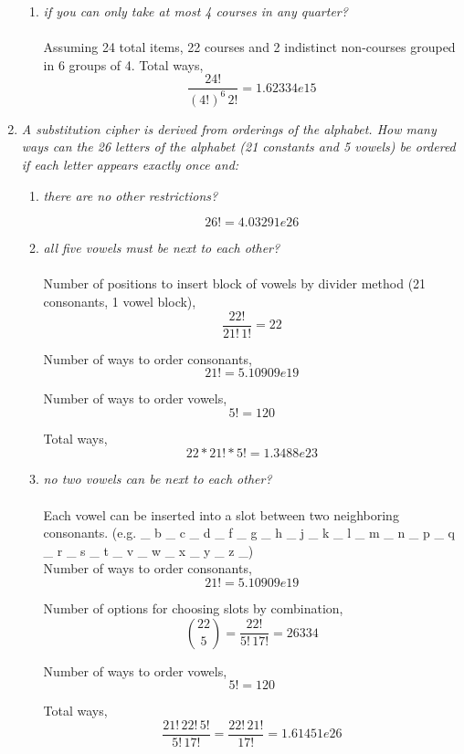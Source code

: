 \documentclass{article} %
\begin{document}
\begin{enumerate}
\begin{enumerate}
		\item \textit{if you can only take at most 4 courses in any quarter?}\\
		\\
		Assuming 24 total items, 22 courses and 2 indistinct non-courses grouped in 6 groups of 4. Total ways, $$\frac{24!}{(4!)^{6}\,2!} = 1.62334e15$$
	
	\end{enumerate}
	
	\item \textit{A substitution cipher is derived from orderings of the alphabet. How many ways can the 26 letters of the alphabet (21 constants and 5 vowels) be ordered if each letter appears exactly once and:}
	\begin{enumerate}
		\item \textit{there are no other restrictions?}
		
		$$26! = 4.03291e26$$
		
		\item \textit{all five vowels must be next to each other?}\\
		\\
		Number of positions to insert block of vowels by divider method (21 consonants, 1 vowel block), $$\frac{22!}{21!\,1!} = 22$$
		
		Number of ways to order consonants, $$21! = 5.10909e19$$
		
		Number of ways to order vowels, $$5! = 120$$
		
		Total ways, $$22*21!*5! = 1.3488e23$$
		
		\item \textit{no two vowels can be next to each other?}\\
		\\
		Each vowel can be inserted into a slot between two neighboring consonants. (e.g. \_ b \_ c \_ d \_ f \_ g \_ h \_ j \_ k \_ l \_ m \_ n \_ p \_ q \_ r \_ s \_ t \_ v \_ w \_ x \_ y \_ z \_)
		\\
		Number of ways to order consonants, $$21! = 5.10909e19$$
		
		Number of options for choosing slots by combination, $$\binom{22}{5} = \frac{22!}{5!\,17!} = 26334$$
		
		Number of ways to order vowels, $$5! = 120$$
		
		Total ways, $$\frac{21!\,22!\,5!}{5!\,17!} = \frac{22!\,21!}{17!} = 1.61451e26$$
		
	\end{enumerate}
	

\end{enumerate}
\end{document}
